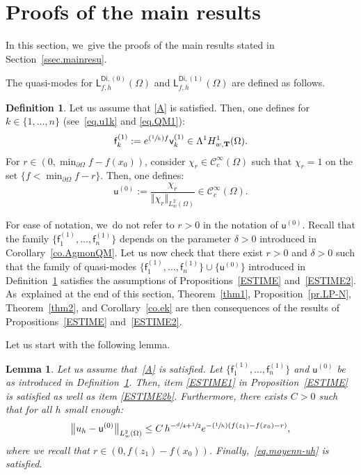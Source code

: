 \documentclass[JEP,XML,SOM,Unicode,NoEqCountersInSection,NoFloatCountersInSection,published]{cedram}
\newcommand{\Psfrac}[2]{(\sfrac{#1}{#2})}
\newcommand{\mbf}[1]{\mathbf{#1}}
\theoremstyle{plain}
\newtheorem{lemma}[proposition]{Lemma}
\theoremstyle{definition}
\newtheorem{definition}[proposition]{Definition}
\begin{document}
\section{Proofs of the main results}\label{sec.mainresu}
In this section, we~give the proofs of the main results stated in Section~\ref{ssec.mainresu}.

\label{sec.proof0}

The quasi-modes for $\mathsf L^{\mathsf{Di},(0)}_{f,h}(\Omega)$ and $\mathsf L^{\mathsf{Di},(1)}_{f,h}(\Omega)$ are defined as follows.

\begin{definition}\label{de.QM-pi}
Let us assume that \ref{A} is satisfied. Then, one defines for $k\in\{1,\ldots,n\}$
(see~\eqref{eq.u1k} and \eqref{eq.QM1}):
\[
\mathsf f_k^{(1)}:= e^{\Psfrac 1h f} \mathsf v_k^{(1)} \in \Lambda^1H^1_{w,\mbf T}(\Omega).
\]
For $r\in (0,\min_{\partial \Omega}f- f(x_0))$, consider $\chi_r\in \mathcal C^\infty_c(\Omega)$ such that $\chi_r=1$ on the set $\{f<\min_{\partial \Omega}f-r\}$. Then, one defines:
\[
\mathsf u^{(0)}:= \frac{\chi_r}{\Vert \chi_r\Vert_{L^2_w(\Omega)}}
\in \mathcal C^\infty_c (\Omega).
\]
\end{definition}

For ease of notation, we~do not refer to $r>0$ in the notation of $
\mathsf u^{(0)}$. Recall that the family $\{\mathsf f_1^{(1)},
\ldots, \mathsf f_n^{(1)}\} $ depends on the parameter $\delta >0$
introduced in Corollary~\ref{co.AgmonQM}.
Let us now check that there exist $r>0$ and $\delta >0$ such that the family of quasi-modes $\{\mathsf f_1^{(1)}, \ldots, \mathsf f_n^{(1)}\} \cup \{ \mathsf u^{(0)} \}$ introduced in Definition~\ref{de.QM-pi} satisfies the assumptions of Propositions~\ref{ESTIME} and~\ref{ESTIME2}. As~explained at the end of this section, Theorem~\ref{thm1}, Proposition~\ref{pr.LP-N}, Theorem~\ref{thm2}, and Corollary~\ref{co.ek} are then consequences of the results of Propositions~\ref{ESTIME} and~\ref{ESTIME2}.

Let us start with the following lemma.
\begin{lemma}\label{de1}
Let us assume that~\ref{A} is satisfied. Let $\{\mathsf f_1^{(1)}, \ldots, \mathsf f_n^{(1)}\} $ and $\mathsf u^{(0)}$ be as introduced in Definition~\ref{de.QM-pi}.
Then, item \eqref{ESTIME1} in Proposition~\ref{ESTIME} is satisfied as well as item \eqref{ESTIME2b}. Furthermore, there exists $C>0$ such that for all $h$ small enough:
\begin{equation}\label{eq.QM0-}
\big \Vert u_h - \mathsf u^{(0)}\big \Vert_{ L_w^2(\Omega)} \le C \, h^{-\sfrac d4 +\sfrac 12} e^{-\Psfrac 1h (f(z_1)-f(x_0)-r)},
\end{equation}
where we recall that $r\in (0,f(z_1)- f(x_0))$.
Finally,~\eqref{eq.moyenn-uh} is satisfied.
\end{lemma}
\end{document}

